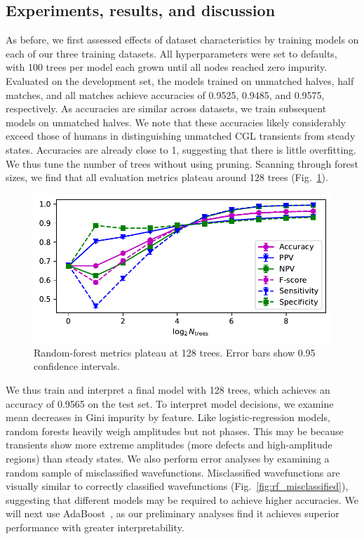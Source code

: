 \documentclass[nofootinbib,pre,superscriptaddress,twocolumn,longbibliography,floatfix]{revtex4-2}
\begin{document}
\subsection{Experiments, results, and discussion}
As before, we first assessed effects of dataset characteristics by training models on each of our three training datasets.
All hyperparameters were set to defaults, with 100 trees per model each grown until all nodes reached zero impurity.
Evaluated on the development set, the models trained on unmatched halves, half matches,
and all matches achieve accuracies of 0.9525, 0.9485, and 0.9575, respectively.
As accuracies are similar across datasets, we train subsequent models on unmatched halves.
We note that these accuracies likely considerably exceed those of humans in distinguishing unmatched CGL transients from steady states.
Accuracies are already close to 1, suggesting that there is little overfitting.
We thus tune the number of trees without using pruning.
Scanning through forest sizes, we find that all evaluation metrics plateau around 128 trees (Fig.~\ref{fig:rf_metrics}).

\begin{figure}[h]
    \centering
    \includegraphics[width=1.0\linewidth]{../figures/random_forest_metrics.pdf}
    \caption{Random-forest metrics plateau at 128 trees.
    Error bars show 0.95 confidence intervals.}
    \label{fig:rf_metrics}
\end{figure}

We thus train and interpret a final model with 128 trees,
which achieves an accuracy of 0.9565 on the test set.
To interpret model decisions, we examine mean decreases in Gini impurity by feature.
Like logistic-regression models, random forests heavily weigh amplitudes but not phases.
This may be because transients show more extreme amplitudes (more defects and high-amplitude regions) than steady states.
We also perform error analyses by examining a random sample of misclassified wavefunctions.
Misclassified wavefunctions are visually similar to correctly classified wavefunctions (Fig.~\ref{fig:rf_misclassified}),
suggesting that different models may be required to achieve higher accuracies.
We will next use AdaBoost~\cite{adaboost}, as our preliminary analyses find it achieves superior performance with greater interpretability.
\end{document}
